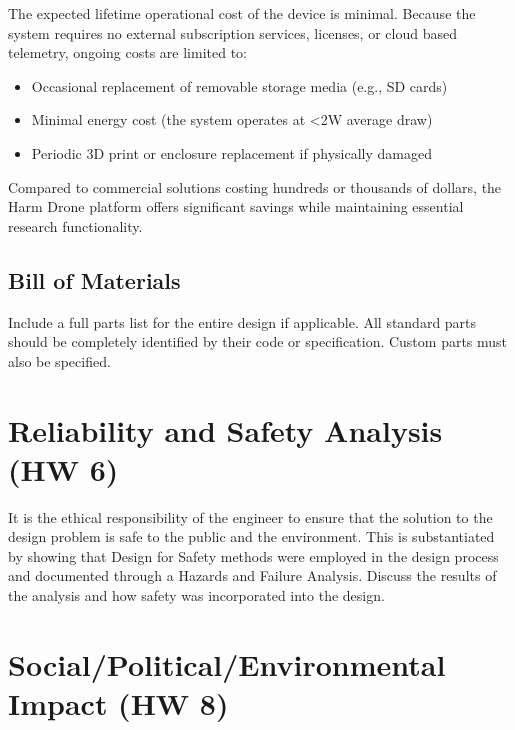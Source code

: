\documentclass[12pt]{article}
\begin{document}
\par The expected lifetime operational cost of the device is minimal. Because the system requires no external subscription services, licenses, or cloud based telemetry, ongoing costs are limited to:

\begin{itemize}
\item Occasional replacement of removable storage media (e.g., SD cards)
\item Minimal energy cost (the system operates at \textless 2W average draw)
\item Periodic 3D print or enclosure replacement if physically damaged
\end{itemize}

\par Compared to commercial solutions costing hundreds or thousands of dollars, the Harm Drone platform offers significant savings while maintaining essential research functionality.

\subsection{Bill of Materials}
Include a full parts list for the entire design if applicable. All standard parts should be completely identified by their code or specification. Custom parts must also be specified.
\section{Reliability and Safety Analysis (HW 6)}
It is the ethical responsibility of the engineer to ensure that the solution to the design problem is safe to the public and the environment. This is substantiated by showing that Design for Safety methods were employed in the design process and documented through a Hazards and Failure Analysis. Discuss the results of the analysis and how safety was incorporated into the design.

\section{Social/Political/Environmental Impact (HW 8)}
\end{document}
